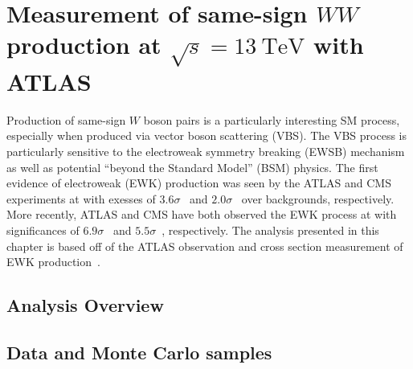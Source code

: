 \chapter[Measurement of same-sign $WW$ production at $\sqrt{s} = 13~\mathrm{TeV}$ with ATLAS][Measurement of same-sign $WW$ production at $\sqrt{s} = 13~\mathrm{TeV}$ with ATLAS]{Measurement of same-sign $WW$ production at $\sqrt{s} = 13~\mathrm{TeV}$ with ATLAS}
\label{ch:ssww13tev}

Production of same-sign $W$ boson pairs is a particularly interesting SM process, especially when produced via vector boson scattering (VBS).
The VBS \ssww process is particularly sensitive to the electroweak symmetry breaking (EWSB) mechanism as well as potential ``beyond the Standard Model'' (BSM) physics.
The first evidence of electroweak (EWK) \ssww production was seen by the ATLAS and CMS experiments at  with exesses of $3.6\sigma$~\cite{2014.ssww-8tev-atlas} and $2.0\sigma$~\cite{2015-ssww-8tev-cms} over backgrounds, respectively.
More recently, ATLAS and CMS have both observed the EWK process at  with significances of $6.9\sigma$~\cite{2018.ssww-13tev-atlas-conf} and $5.5\sigma$~\cite{2017.ssww-13tev-cms}, respectively.
The analysis presented in this chapter is based off of the ATLAS  observation and cross section measurement of EWK \ssww production~\cite{2018.ssww-13tev-atlas-conf, 2018.ssww-13tev-atlas-support}.

\section{Analysis Overview}\label{ssww13tev:overview}


%

\section{Data and Monte Carlo samples}\label{ssww13tev:data_mc}


